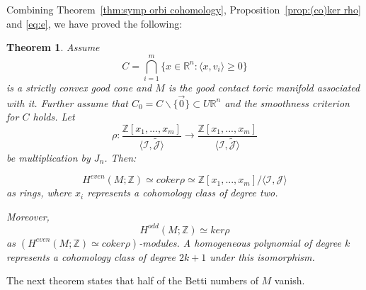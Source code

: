 \documentclass[12pt]{amsart}
\newtheorem{theorem}{Theorem}[section]
\theoremstyle{definition}
\numberwithin{equation}{section}
\begin{document}
Combining Theorem~\ref{thm:symp orbi cohomology},
Proposition~\ref{prop:(co)ker rho} and \eqref{eq:e}, we have proved
the following:
\begin{theorem}\label{thm:contact cohomology}
Assume \begin{equation}
 C= \bigcap_{i=1}^{m}\{x\in {{\mathbb{R}}}^n: \langle x, v_{i}\rangle \geq 0\}
\end{equation} is a strictly convex good cone and $M$ is the good contact toric
manifold associated with it. Further assume that
$C_{0}=C\backslash\{\vec{0}\}\subset U{{\mathbb{R}}}^n$ and the smoothness
criterion for $C$ holds. Let
\begin{equation}\rho:\frac{{{\mathbb{Z}}}[x_{1},...,x_{m}]}{\langle \mathcal
{I},\widetilde{{\mathcal{J}}} \rangle}\rightarrow
\frac{{{\mathbb{Z}}}[x_{1},...,x_{m}]}{\langle \mathcal
{I},\widetilde{{\mathcal{J}}}\rangle}
\end{equation}
be multiplication by $J_{n}$. Then:

\begin{equation}\label{eq:7}
H^{even}(M;{{\mathbb{Z}}})\simeq coker\rho\simeq {{\mathbb{Z}}}[x_{1},...,x_{m}]/\langle
{{\mathcal{I}}},{{\mathcal{J}}} \rangle\end{equation} as rings, where $x_{i}$ represents a
cohomology class of degree two.

 Moreover,
\begin{equation}\label{eq:8}
H^{odd}(M;{{\mathbb{Z}}})\simeq ker\rho \end{equation} as $(H^{even}(M;{{\mathbb{Z}}})\simeq
coker\rho)$-modules. A homogeneous polynomial of degree $k$
represents a cohomology class of degree $2k+1$ under this
isomorphism.
\end{theorem}

The next theorem states that half of the Betti numbers of $M$
vanish.
\end{document}
